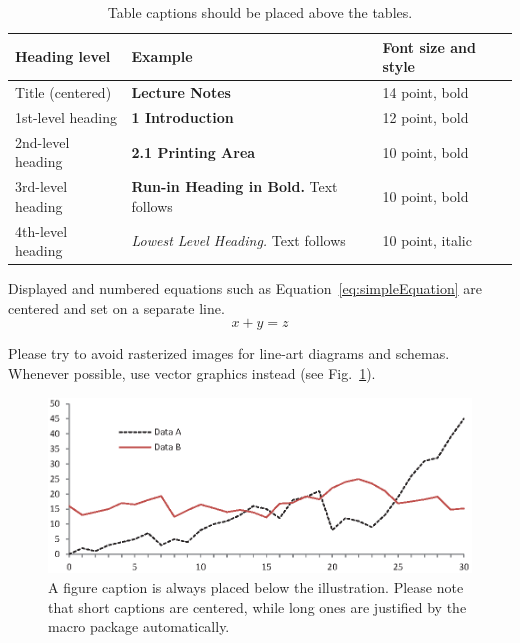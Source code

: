 \documentclass{llncs}
\begin{document}
\begin{table}
\caption{Table captions should be placed above the
tables.}\label{tab1}
\begin{tabular}{|l|l|l|}
\hline
Heading level &  Example & Font size and style\\
\hline
Title (centered) &  {\Large\bfseries Lecture Notes} & 14 point, bold\\
1st-level heading &  {\large\bfseries 1 Introduction} & 12 point, bold\\
2nd-level heading & {\bfseries 2.1 Printing Area} & 10 point, bold\\
3rd-level heading & {\bfseries Run-in Heading in Bold.} Text follows & 10 point, bold\\
4th-level heading & {\itshape Lowest Level Heading.} Text follows & 10 point, italic\\
\hline
\end{tabular}
\end{table}



Displayed and numbered equations such as Equation~\ref{eq:simpleEquation} are centered and set on a separate line.
\begin{equation}
\label{eq:simpleEquation}
x + y = z
\end{equation}

Please try to avoid rasterized images for line-art diagrams and
schemas. Whenever possible, use vector graphics instead (see
Fig.~\ref{fig1}).

\begin{figure}
\includegraphics[width=\textwidth]{fig1.eps}
\caption{A figure caption is always placed below the illustration.
Please note that short captions are centered, while long ones are
justified by the macro package automatically.} \label{fig1}
\end{figure}
\end{document}

